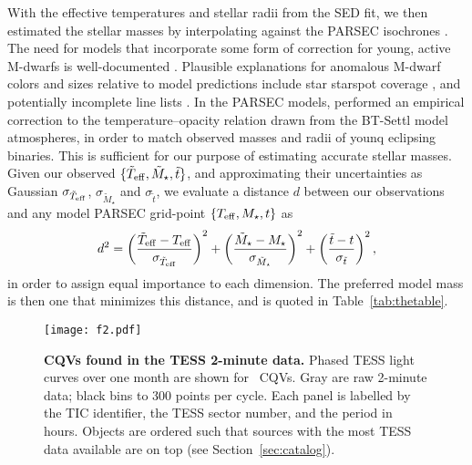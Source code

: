 \documentclass[11pt,twocolumn,tighten]{aastex63}
\begin{document}
With the effective temperatures and stellar radii from the SED fit, we
then estimated the stellar masses by interpolating against the PARSEC
isochrones \citep[v1.2S][]{2014MNRAS.444.2525C}.  The need for models
that incorporate some form of correction for young, active M-dwarfs is
well-documented
\citep[e.g.][]{2012ApJ...756...47S,2015ApJ...804..146D,2016A&A...593A..99F,2020ApJ...891...29S}.
Plausible explanations for anomalous M-dwarf colors and sizes relative
to model predictions include star starspot coverage
\citep[e.g.][]{2017ApJ...836..200G}, and potentially incomplete line
lists \citep[e.g.][]{2013A&A...556A..15R}.  In the PARSEC models,
\citet{2014MNRAS.444.2525C} performed an empirical correction to the
temperature--opacity relation drawn from the BT-Settl model
atmospheres, in order to match observed masses and radii of younq
eclipsing binaries.  This is sufficient for our purpose of estimating
accurate stellar masses.  Given our observed $\{ \tilde{T}_{\rm eff},
\tilde{M}_\star, \tilde{t} \}$, and approximating their uncertainties
as Gaussian $\sigma_{\tilde{T}_{\rm eff}}$, $\sigma_{\tilde{M}_\star}$
and $\sigma_{\tilde{t}}$, we evaluate a distance $d$ between our
observations and any model PARSEC grid-point $\{ T_{\rm eff}, M_\star,
t \}$ as
\begin{equation}
  d^2 = 
  \left( \frac{\tilde{T}_{\rm eff} - T_{\rm eff}}{\sigma_{\tilde{T}_{\rm eff}}} \right)^2
  +
  \left( \frac{\tilde{M}_{\star} - M_{\star}}{\sigma_{\tilde{M}_{\star}}} \right)^2
  +
  \left( \frac{\tilde{t} - t}{\sigma_{\tilde{t}}} \right)^2,
\end{equation}
in order to assign equal importance to each dimension.  The preferred
model mass is then one that minimizes this distance, and is quoted in
Table~\ref{tab:thetable}.


\begin{figure*}[!tp]
	\begin{center}
		\centering
		\texttt{[image: f2.pdf]}
    \vspace{-0.7cm}
		\caption{
      {\bf CQVs found in the TESS 2-minute data.}
      Phased TESS light curves over one month are shown for \ngoods\
      CQVs.  Gray are raw 2-minute data; black bins to 300 points per
      cycle.  Each panel is labelled by the TIC identifier, the TESS
      sector number, and the period in hours.  Objects are ordered
      such that sources with the most TESS data available are on top
      (see Section~\ref{sec:catalog}).
		}
		\label{fig:cqvs}
	\end{center}
\end{figure*}
\end{document}

